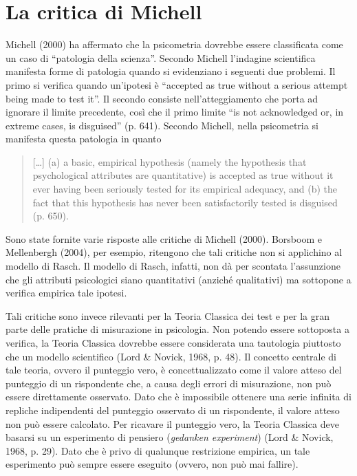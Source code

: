 \section{La critica di Michell}

Michell (2000) ha affermato che la psicometria dovrebbe essere classificata come un caso di ``patologia della scienza''. Secondo Michell l'indagine scientifica manifesta forme di patologia quando  si evidenziano i seguenti due problemi. Il primo si verifica quando un'ipotesi è ``accepted as 
true without a serious attempt being made to test it''. Il secondo consiste nell'atteggiamento che porta ad ignorare il limite precedente, così che il primo limite ``is not acknowledged or, in extreme cases, is disguised'' (p. 641). Secondo Michell, nella psicometria si manifesta questa patologia in quanto
\begin{quote}
[\dots] (a) a basic, empirical hypothesis (namely the hypothesis that psychological attributes are quantitative) is accepted as true without it ever having been seriously tested for its empirical adequacy, and (b) the fact that this hypothesis has never been satisfactorily tested is disguised (p. 650).  
\end{quote}

Sono state fornite varie risposte alle critiche di Michell (2000). Borsboom e Mellenbergh (2004), per esempio, ritengono che tali critiche non si applichino al modello di Rasch. Il modello di Rasch, infatti, non dà per scontata l'assunzione che gli attributi psicologici siano quantitativi (anziché qualitativi) ma sottopone a verifica empirica tale ipotesi. 

Tali critiche sono invece rilevanti per la Teoria Classica dei test e per la gran parte delle pratiche di misurazione in psicologia.  Non potendo essere sottoposta a verifica, la Teoria Classica dovrebbe essere considerata una tautologia piuttosto che un modello scientifico (Lord \& Novick, 1968, p. 48). Il concetto centrale di tale teoria, ovvero il punteggio vero, è concettualizzato come il valore atteso del punteggio di un  rispondente che, a causa degli errori di misurazione, non può essere direttamente osservato. Dato che è impossibile ottenere una serie infinita di repliche indipendenti del punteggio osservato di un rispondente, il valore atteso non può essere calcolato. Per ricavare il punteggio vero, la Teoria Classica deve  basarsi su un esperimento di pensiero ({\it gedanken experiment}) (Lord \& Novick, 1968, p. 29). Dato che è privo di qualunque restrizione empirica, un tale esperimento può sempre essere eseguito (ovvero, non può mai fallire).  

